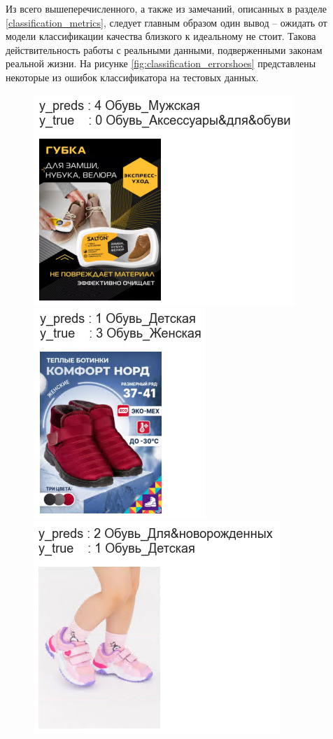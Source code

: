 \documentclass[a4paper,12pt]{extarticle}
\begin{document}
Из всего вышеперечисленного, а также из замечаний, описанных в разделе \ref{classification_metrics}, следует главным образом один вывод – ожидать от модели классификации качества близкого к идеальному не стоит. Такова действительность работы с реальными данными, подверженными законам реальной жизни. На рисунке \ref{fig:classification_errorshoes} представлены некоторые из ошибок классификатора на тестовых данных.

\begin{figure}[ht]
	\centering
	\begin{minipage}[b]{1.2in}
		\includegraphics[scale=0.4]{classification/classification_errorshoes1.png}
	\end{minipage}
	\hfill
	\begin{minipage}[b]{0.8in}
		\includegraphics[scale=0.4]{classification/classification_errorshoes2.png}
	\end{minipage}
	\hfill
	\begin{minipage}[b]{1.1in}
		\includegraphics[scale=0.4]{classification/classification_errorshoes3.png}

\end{minipage}
\end{figure}
\end{document}
